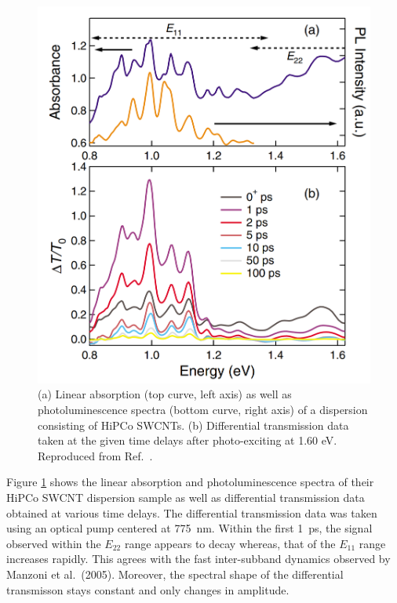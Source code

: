 \begin{figure}[ht]
	\centering
	\includegraphics[scale=0.22]{images/chapter_prior_works/abs_dtt_gordana_2005}
	\caption{(a) Linear absorption (top curve, left axis) as well as photoluminescence spectra (bottom curve, right axis) of a dispersion consisting of HiPCo SWCNTs. (b) Differential transmission data taken at the given time delays after photo-exciting at 1.60 eV. Reproduced from Ref.\ \cite{ostojic2005stability}. }
	\label{fig:abs_dtt_gordana_2005}
\end{figure}

Figure \ref{fig:abs_dtt_gordana_2005} shows the linear absorption and photoluminescence spectra of their HiPCo SWCNT dispersion sample as well as differential transmission data obtained at various time delays. The differential transmission data was taken using an optical pump centered at \SI{775}{\nano\meter}. Within the first \SI{1}{\pico\second}, the signal observed within the $E_{22}$ range appears to decay whereas, that of the $E_{11}$ range increases rapidly. This agrees with the fast inter-subband dynamics observed by Manzoni et al.\ (2005). Moreover, the spectral shape of the differential transmisson stays constant and only changes in amplitude.


